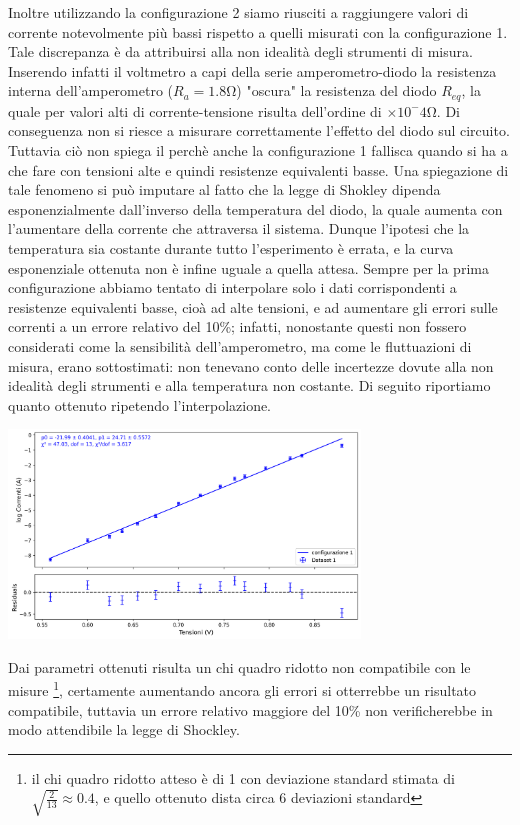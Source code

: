 \documentclass[a4paper]{article}
\begin{document}
Inoltre utilizzando la configurazione 2 siamo riusciti a raggiungere valori di corrente notevolmente più bassi rispetto a quelli misurati con la configurazione 1. Tale discrepanza è da attribuirsi alla non idealità degli strumenti di misura. Inserendo infatti il voltmetro a capi della serie amperometro-diodo la resistenza interna dell'amperometro (\(R_a=1.8 \si\ohm\)) "oscura" la resistenza del diodo \(R_{eq}\), la quale per valori alti di corrente-tensione risulta dell'ordine di \(\times 10^-4\si\ohm\). Di conseguenza non si riesce a misurare correttamente l'effetto del diodo sul circuito.
Tuttavia ciò non spiega il perchè anche la configurazione 1 fallisca quando si ha a che fare con tensioni alte e quindi resistenze equivalenti basse.
Una spiegazione di tale fenomeno si può imputare al fatto che la legge di Shokley dipenda esponenzialmente dall'inverso della temperatura del diodo, la quale aumenta con l'aumentare della corrente che attraversa il sistema. Dunque l'ipotesi che la temperatura sia costante durante tutto l'esperimento è errata, e la curva esponenziale ottenuta non è infine uguale a quella attesa. Sempre per la prima configurazione abbiamo tentato di interpolare solo i dati corrispondenti a resistenze equivalenti basse, cioà ad alte tensioni, e ad aumentare gli errori sulle correnti a un errore relativo del 10\%; infatti, nonostante questi non fossero considerati come la sensibilità dell'amperometro, ma come le fluttuazioni di misura, erano sottostimati: non tenevano conto delle incertezze dovute alla non idealità degli strumenti e alla temperatura non costante.
Di seguito riportiamo quanto ottenuto ripetendo l'interpolazione.
\begin{center}
    \includegraphics[width=0.7\textwidth]{grafici/diodo_sad.png}
\end{center}
Dai parametri ottenuti risulta un chi quadro ridotto non compatibile con le misure \footnote{il chi quadro ridotto atteso è di 1 con deviazione standard stimata di $\sqrt{\frac{2}{13}} \approx 0.4$, e quello ottenuto dista circa 6 deviazioni standard}, certamente aumentando ancora gli errori si otterrebbe un risultato compatibile, tuttavia un errore relativo maggiore del 10\% non verificherebbe in modo attendibile la legge di Shockley.
\end{document}
